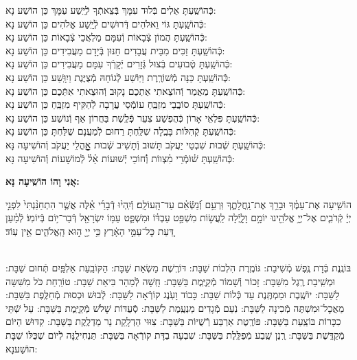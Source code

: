 \documentclass[twoside, openany, parskip=half, 11pt]{book}
\begin{document}
\begin{sometimes}
\begin{small}
 כְּֿהוֹשַֽׁעְתָּ אֵלִים בְּֿלוּד עִמָּךְ בְּֿצֵאתְֿךָ לְֿיֵֽשַׁע עַמָּךְ \hfill כֵּן הוֹשַׁע נָא: \\
כְּֿהוֹשַֽׁעְתָּ גּוֹי וֵאלֹהִים דְּֿרוּשִׁים לְֿיֵֽשַׁע אֱלֹהִים \hfill כֵּן הוֹשַׁע נָא: \\
כְּֿהוֹשַֽׁעְתָּ הֲמוֹן צְֿבָאוֹת וְֿעִמָּם מַלְאֲכֵי צְֿבָאוֹת \hfill כֵּן הוֹשַׁע נָא: \\
כְּֿהוֹשַֽׁעְתָּ זַכִּים מִבֵּית עֲבָדִים חַנּוּן בְּֿיָדָם מַעֲבִידִים \hfill כֵּן הוֹשַׁע נָא: \\
כְּֿהוֹשַֽׁעְתָּ טְֿבוּעִים בְּֿצוּל גְּֿזָרִים יְֿקָרְֿךָ עִמָּם מַעֲבִירִים \hfill כֵּן הוֹשַׁע נָא: \\
כְּֿהוֹשַֽׁעְתָּ כַּנָּה מְֿשׁוֹרֶֽרֶת וַיּֽוֹשַׁע לְֿגוֹחָהּ מְֿצֻיֶּנֶת וַיִוָּֽשַׁע \hfill כֵּן הוֹשַׁע נָא: \\
כְּֿהוֹשַֽׁעְתָּ מַאֲמַר וְֿהוֹצֵאתִי אֶתְכֶם נָקוּב וְֿהוּצֵאתִי אִתְּֿכֶם \hfill כֵּן הוֹשַׁע נָא:\\
כְּֿהוֹשַֽׁעְתָּ סוֹבֲבֵי מִזְבֵּֽחַ עוֹמְֿסֵי עֲרָבָה לְֿהַקִּיף מִזְבֵּֽחַ \hfill כֵּן הוֹשַׁע נָא: \\
כְּֿהוֹשַֽׁעְתָּ פִּלְאֵי אָרוֹן כְּֿהֻפְשַׁע צִעֵר פְּֿלֶֽשֶׁת בַּחֲרוֹן אַף וְֿנוֹשַׁע \hfill כֵּן הוֹשַׁע נָא:\\
כְּֿהוֹשַֽׁעְתָּ קְֿהִלּוֹת בָּבֶֽלָה שִׁלַּֽחְתָּ רַחוּם לְֿמַעֲנָם שֻׁלַּחְתָּ \hfill כֵּן הוֹשַׁע נָא:\\

כְּֿהוֹשַֽׁעְתָּ שְֿׁבוּת שִׁבְטֵי יַעֲקֹב תָּשׁוּב וְֿתָשִׁיב שְֿׁבוּת אׇׇׇׇׇׇׇׇָהֳלֵי יַעֲקֹב \hfill וְֿהוֹשִׁיעָה נָּא:\\
 כְּֿהוֹשַֽׁעְתָּ שׁ֗וֹמְֿרֵי מִ֗צְווֹת וְֿ֗חוֹכֵי יְֿשׁוּעוֹת אֵ֗ל֗ לְֿמוֹשָׁעוֹת \hfill וְֿהוֹשִׁיעָה נָּא:

\end{small}

\begin{large}
\textbf{אֲנִי וָהוֹ הוֹשִֽׁיעָה נָּא:}
\end{large}

הוֹשִׁ֤יעָה אֶת־עַמֶּ֗ךָ וּבָרֵ֥ךְ אֶת־נַֽחֲלָתֶ֑ךָ וּֽרְעֵ֥ם וְֿ֝נַשְּֿׂאֵ֗ם עַד־הָֽעוֹלָֽם׃ וְֿיִֽהְי֨וּ דְֿבָרַ֜י אֵ֗לֶּה אֲשֶׁ֤ר הִתְחַנַּ֨נְתִּי֙ לִפְנֵ֣י יְיָ֔ קְֿרֹבִ֛ים אֶל־יְיָ֥ אֱלֹהֵ֖ינוּ יוֹמָ֣ם וָלָ֑יְֿלָה לַֽעֲשׂ֣וֹת מִשְׁפַּ֣ט עַבְדּ֗וֹ וּמִשְׁפַּ֛ט עַמּ֥וֹ יִשְׂרָאֵ֖ל דְּֿבַר־י֥וֹם בְּֿיוֹמֽוֹ׃ לְֿמַ֗עַן דַּ֚עַת כׇּל־עַמֵּ֣י הָאָ֔רֶץ כִּ֥י יְיָ֖ ה֣וּא הָֽאֱלֹהִ֑ים אֵ֖ין עֽוֹד׃

\sepline

\\
 בּוֹנֶֽנֶת בְּֿדָת נֶֽפֶשׁ מְֿשִׁיבַת: גּוֹמֶֽרֶת הִלְכוֹת שַׁבָּת: דּוֹרֶֽשֶׁת מַשְׂאַת שַׁבָּת: הַקּוֹבַֽעַת אַלְפַּֽיִם תְּֿחוּם שַׁבָּת: וּמְשִֽׁיבַת רֶֽגֶל מִשַּׁבָּת: זָכוֹר וְֿשָׁמוֹר מְֿקַיֶּֽמֶת בַּשַּׁבָּת: חָֽשָׁה לְֿמַהֵר בִּיאַת שַׁבָּת: טוֹרַֽחַת כֹּל מִשִּׁשָּה לַשַּׁבָּת: יוֹשֶֽׁבֶת וּמַמְתֶּֽנֶת עַד כְּֿלוֹת שַׁבָּת: כָּבוֹד וָעֹֽנֶג קוֹרְֿאָה לַשַּׁבָּת: לְֿבוּשׁ וּכְסוּת מְֿחַלֶּֽפֶת בַּשַּׁבָּת: מַאֲכׇל־וּמִשְׁתֶּה מְֿכִינָה לַשַּׁבָּת: נֹֽעַם מְֿגָדִים מַנְעֶֽמֶת לַשַּׁבָּת: סְֿעֻדּוֹת שָׁלֹשׁ מְֿקַיֶּֽמֶת בַּשַּׁבָּת: עַל שְֿׁתֵּי כִכָּרוֹת בּוֹצַֽעַת בַּשַּׁבָּת: פּוֹרֶֽטֶת אַרְבַּע רְֿשֻׁיּוֹת בַּשַּׁבָּת: צִוּוּי הַדְלָֽקַת נֵר מַדְלֶֽקֶת בַּשַּׁבָּת: קִדּוּשׁ הַיּוֹם מְֿקַדֶּֽשֶׁת בַּשַּׁבָּת: רֶֽנֶן שֶֽׁבַע מְֿפַלֶּֽלֶת בַּשַּׁבָּת: שִׁבְעָה בַדָּת קוֹרְֿאָה בַּשַּׁבָּת: תַּנְחִילֶֽנָּה לְֿיוֹם שֶׁכֻּלּוֹ שַׁבָּת הוֹשַׁענָא:


\end{sometimes}
\end{document}
